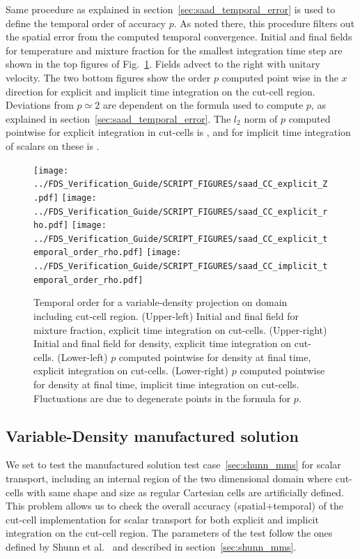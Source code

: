 \documentclass[11pt]{book}
\begin{document}
Same procedure as explained in section~\ref{sec:saad_temporal_error} is used to define the temporal order of accuracy $p$. As noted there, this procedure filters out the spatial error from the computed temporal convergence. Initial and final fields for temperature and mixture fraction for the smallest integration time step are shown in the top figures of Fig.~\ref{fig:saad_cc_temporal_order}. Fields advect to the right with unitary velocity. The two bottom figures show the order $p$ computed point wise in the $x$ direction for explicit and implicit time integration on the cut-cell region. Deviations from $p \simeq 2$ are dependent on the formula used to compute $p$, as explained in section~\ref{sec:saad_temporal_error}.
The $l_2$ norm of $p$ computed pointwise for explicit integration in cut-cells is \!, and for implicit time integration of scalars on these is  \!.

\begin{figure}[ht]
\centering
\texttt{[image: ../FDS\_Verification\_Guide/SCRIPT\_FIGURES/saad\_CC\_explicit\_Z.pdf]}
\texttt{[image: ../FDS\_Verification\_Guide/SCRIPT\_FIGURES/saad\_CC\_explicit\_rho.pdf]}
\texttt{[image: ../FDS\_Verification\_Guide/SCRIPT\_FIGURES/saad\_CC\_explicit\_temporal\_order\_rho.pdf]}
\texttt{[image: ../FDS\_Verification\_Guide/SCRIPT\_FIGURES/saad\_CC\_implicit\_temporal\_order\_rho.pdf]}
\caption[The {\ct saad CC} temporal order test case]{Temporal order for a variable-density projection on domain including cut-cell region.  (Upper-left) Initial and final field for mixture fraction, explicit time integration on cut-cells.  (Upper-right) Initial and final field for density, explicit time integration on cut-cells.  (Lower-left) $p$ computed pointwise for density at final time, explicit integration on cut-cells. (Lower-right) $p$ computed pointwise for density at final time, implicit time integration on cut-cells.  Fluctuations are due to degenerate points in the formula for $p$.}\label{fig:saad_cc_temporal_order}
\end{figure}


\subsection{Variable-Density manufactured solution}

\label{sec:shunn_cc_mms}


We set to test the manufactured solution test case~\ref{sec:shunn_mms} for scalar transport, including an internal region of the two dimensional domain where cut-cells with same shape and size as regular Cartesian cells are artificially defined. This problem allows us to check the overall accuracy (spatial+temporal) of the cut-cell implementation for scalar transport for both explicit and implicit integration on the cut-cell region.
The parameters of the test follow the ones defined by Shunn et al.~\cite{Shunn:2012} and described in section~\ref{sec:shunn_mms}.
\end{document}
